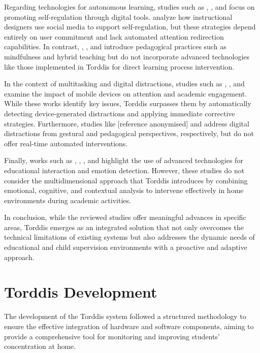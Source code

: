 			Regarding technologies for autonomous learning, studies such as \cite{Bembich2016Future}, \cite{Roberts2020Task}, and \cite{Peters2003Self} focus on promoting self-regulation through digital tools. \cite{Muljana2022Instructional} analyze how instructional designers use social media to support self-regulation, but these strategies depend entirely on user commitment and lack automated attention redirection capabilities. In contrast, \cite{Palmer2022impact}, \cite{Adcroft2018Developing}, and \cite{Salter2014Exploring} introduce pedagogical practices such as mindfulness and hybrid teaching but do not incorporate advanced technologies like those implemented in Torddis for direct learning process intervention.
			
			In the context of multitasking and digital distractions, studies such as \cite{Hartley2022Smartphone}, \cite{Labar2019Interplay}, and \cite{Farsani2020} examine the impact of mobile devices on attention and academic engagement. While these works identify key issues, Torddis surpasses them by automatically detecting device-generated distractions and applying immediate corrective strategies. Furthermore, studies like [reference anonymised] and \cite{Wang2022Empowering} address digital distractions from gestural and pedagogical perspectives, respectively, but do not offer real-time automated interventions.
			
			Finally, works such as \cite{Kulkarni2023}, \cite{Enadula2021}, \cite{Ozdamli2022}, and \cite{Warren2015Brief} highlight the use of advanced technologies for educational interaction and emotion detection. However, these studies do not consider the multidimensional approach that Torddis introduces by combining emotional, cognitive, and contextual analysis to intervene effectively in home environments during academic activities.
			
			In conclusion, while the reviewed studies offer meaningful advances in specific areas, Torddis emerges as an integrated solution that not only overcomes the technical limitations of existing systems but also addresses the dynamic needs of educational and child supervision environments with a proactive and adaptive approach.
	
	\section{Torddis Development}
	\label{section:fourth}
		The development of the Torddis system followed a structured methodology to ensure the effective integration of hardware and software components, aiming to provide a comprehensive tool for monitoring and improving students’ concentration at home.
		
